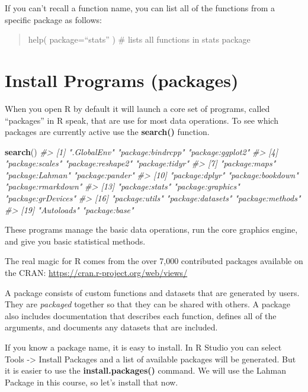 \documentclass[]{book}
\newenvironment{Shaded}{\begin{snugshade}}{\end{snugshade}}
\newcommand{\CommentTok}[1]{\textcolor[rgb]{0.56,0.35,0.01}{\textit{#1}}}
\newcommand{\KeywordTok}[1]{\textcolor[rgb]{0.13,0.29,0.53}{\textbf{#1}}}
\newcommand{\NormalTok}[1]{#1}
\theoremstyle{definition}
\theoremstyle{definition}
\theoremstyle{definition}
\theoremstyle{remark}
\begin{document}
If you can't recall a function name, you can list all of the functions
from a specific package as follows:

\begin{quote}
help( package=``stats'' ) \# lists all functions in stats package
\end{quote}

\hypertarget{install-programs-packages}{%
\section{Install Programs (packages)}\label{install-programs-packages}}

When you open R by default it will launch a core set of programs, called
``packages'' in R speak, that are use for most data operations. To see
which packages are currently active use the \textbf{search()} function.

\begin{Shaded}
\begin{Highlighting}[]
\KeywordTok{search}\NormalTok{()}
\CommentTok{#>  [1] ".GlobalEnv"        "package:bindrcpp"  "package:ggplot2"  }
\CommentTok{#>  [4] "package:scales"    "package:reshape2"  "package:tidyr"    }
\CommentTok{#>  [7] "package:maps"      "package:Lahman"    "package:pander"   }
\CommentTok{#> [10] "package:dplyr"     "package:bookdown"  "package:rmarkdown"}
\CommentTok{#> [13] "package:stats"     "package:graphics"  "package:grDevices"}
\CommentTok{#> [16] "package:utils"     "package:datasets"  "package:methods"  }
\CommentTok{#> [19] "Autoloads"         "package:base"}
\end{Highlighting}
\end{Shaded}

These programs manage the basic data operations, run the core graphics
engine, and give you basic statistical methods.

The real magic for R comes from the over 7,000 contributed packages
available on the CRAN: \url{https://cran.r-project.org/web/views/}

A package consists of custom functions and datasets that are generated
by users. They are \emph{packaged} together so that they can be shared
with others. A package also includes documentation that describes each
function, defines all of the arguments, and documents any datasets that
are included.

If you know a package name, it is easy to install. In R Studio you can
select Tools -\textgreater{} Install Packages and a list of available
packages will be generated. But it is easier to use the
\textbf{install.packages()} command. We will use the Lahman Package in
this course, so let's install that now.
\end{document}
